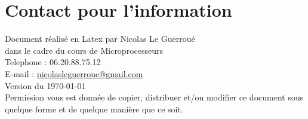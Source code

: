 
\section*{Contact pour l'information}

Document réalisé en Latex par Nicolas Le Guerroué \\
dans le cadre du cours de Microprocesseurs\\
Telephone : 06.20.88.75.12 \\
E-mail : \href{mailto:nicolasleguerroue@gmail.com}{nicolasleguerroue@gmail.com} \\
Version du \today \\

Permission vous est donnée de copier, distribuer et/ou modifier ce document sous quelque forme et de quelque manière que ce soit.



